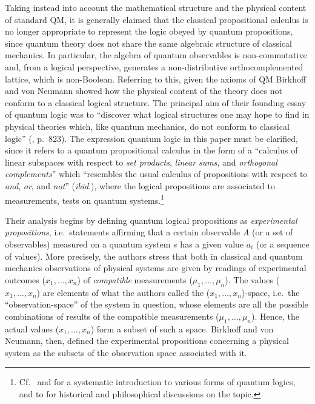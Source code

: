 \documentclass[11pt, executivepaper]{article}
\begin{document}
Taking instead into account the mathematical structure and the physical content of standard QM, it is generally claimed that the classical propositional calculus is no longer appropriate to represent the logic obeyed by quantum propositions, since quantum theory does not share the same algebraic structure of classical mechanics. In particular, the algebra of quantum observables is non-commutative and, from a logical perspective, generates a non-distributive orthocomplemented lattice, which is non-Boolean. 
Referring to this, given the axioms of QM Birkhoff and von Neumann showed how the physical content of the theory does not conform to a classical logical structure. The principal aim of their founding essay of quantum logic was to ``discover what logical structures one may hope to find in physical theories which, like quantum mechanics, do not conform to classical logic'' (\cite{vonNeumann:1936}, p.\ 823). The expression quantum logic in this paper must be clarified, since it refers to a quantum propositional calculus in the form of a ``calculus of linear subspaces with respect to \emph{set products}, \emph{linear sums}, and \emph{orthogonal complements}'' which ``resembles the usual calculus of propositions with respect to \emph{and}, \emph{or}, and \emph{not}'' (\emph{ibid}.), where the logical propositions are associated to measurements, tests on quantum systems.\footnote{Cf.\ \cite{Giuntini:2002} and \cite{DallaChiara:2004} for a systematic introduction to various forms of quantum logics, and to \cite{Engesser:2009} for historical and philosophical discussions on the topic.}

Their analysis begins by defining quantum logical propositions as \emph{experimental propositions}, i.e.\ statements affirming that a certain observable $A$ (or a set of observables) measured on a quantum system $s$ has a given value $a_i$ (or a sequence of values). More precisely, the authors stress that both in classical and quantum mechanics observations of physical systems are given by readings of experimental outcomes ($x_1, \dots, x_n$) of \emph{compatible} measurements ($\mu_1, \dots, \mu_n$). The values ($x_1, \dots, x_n$) are elements of what the authors called the ($x_1, \dots, x_n$)-space, i.e.\ the ``observation-space'' of the system in question, whose elements are all the possible combinations of results of the compatible measurements ($\mu_1, \dots, \mu_n$). Hence, the actual values ($x_1, \dots, x_n$) form a subset of such a space. Birkhoff and von Neumann, then, defined the experimental propositions concerning a physical system as the subsets of the observation space associated with it.
\end{document}

